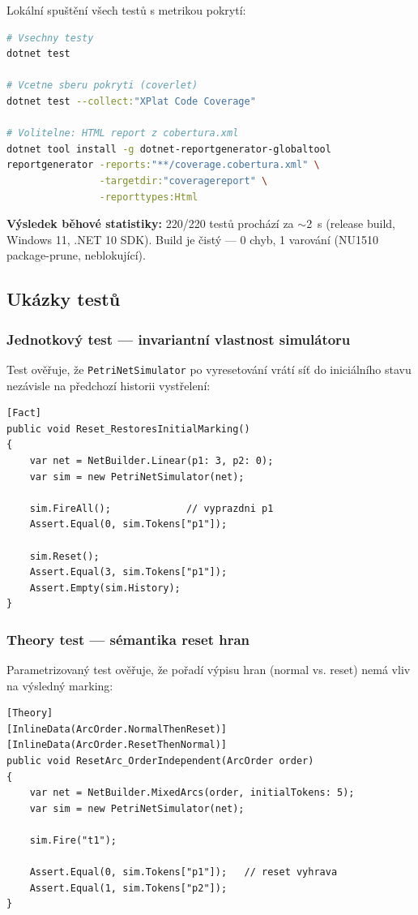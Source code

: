 \documentclass[12pt,a4paper]{article}
\begin{document}
Lokální spuštění všech testů s metrikou pokrytí:

\begin{lstlisting}[language=bash]
# Vsechny testy
dotnet test

# Vcetne sberu pokryti (coverlet)
dotnet test --collect:"XPlat Code Coverage"

# Volitelne: HTML report z cobertura.xml
dotnet tool install -g dotnet-reportgenerator-globaltool
reportgenerator -reports:"**/coverage.cobertura.xml" \
                -targetdir:"coveragereport" \
                -reporttypes:Html
\end{lstlisting}

\textbf{Výsledek běhové statistiky:} 220/220 testů prochází za $\sim$2~s
(release build, Windows 11, .NET 10 SDK). Build je čistý — 0 chyb,
1 varování (NU1510 package-prune, neblokující).

\subsection{Ukázky testů}

\subsubsection{Jednotkový test — invariantní vlastnost simulátoru}

Test ověřuje, že \texttt{PetriNetSimulator} po vyresetování vrátí
síť do iniciálního stavu nezávisle na předchozí historii vystřelení:

\begin{lstlisting}[language={[Sharp]C}]
[Fact]
public void Reset_RestoresInitialMarking()
{
    var net = NetBuilder.Linear(p1: 3, p2: 0);
    var sim = new PetriNetSimulator(net);

    sim.FireAll();             // vyprazdni p1
    Assert.Equal(0, sim.Tokens["p1"]);

    sim.Reset();
    Assert.Equal(3, sim.Tokens["p1"]);
    Assert.Empty(sim.History);
}
\end{lstlisting}

\subsubsection{Theory test — sémantika reset hran}

Parametrizovaný test ověřuje, že pořadí výpisu hran (normal vs. reset)
nemá vliv na výsledný marking:

\begin{lstlisting}[language={[Sharp]C}]
[Theory]
[InlineData(ArcOrder.NormalThenReset)]
[InlineData(ArcOrder.ResetThenNormal)]
public void ResetArc_OrderIndependent(ArcOrder order)
{
    var net = NetBuilder.MixedArcs(order, initialTokens: 5);
    var sim = new PetriNetSimulator(net);

    sim.Fire("t1");

    Assert.Equal(0, sim.Tokens["p1"]);   // reset vyhrava
    Assert.Equal(1, sim.Tokens["p2"]);
}
\end{lstlisting}
\end{document}
